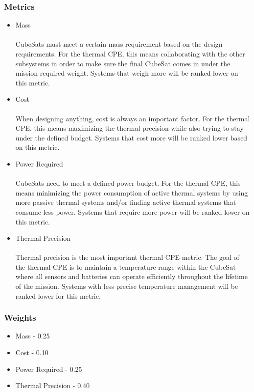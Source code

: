 \documentclass[3p]{elsarticle}
\begin{document}
\subsubsection{Metrics}
\begin{itemize}
   \item Mass \\
   \\
CubeSats must meet a certain mass requirement based on the design requirements. For the thermal CPE, this means collaborating with the other subsystems in order to make sure the final CubeSat comes in under the mission required weight. Systems that weigh more will be ranked lower on this metric.
   \item Cost \\
   \\
When designing anything, cost is always an important factor. For the thermal CPE, this means maximizing the thermal precision while also trying to stay under the  defined budget. Systems that cost more will be ranked lower based on this metric.
   \item Power Required \\
   \\
CubeSats need to meet a defined power budget. For the thermal CPE, this means minimizing the power consumption of active thermal systems by using more passive thermal systems and/or finding active thermal systems that consume less power. Systems that require more power will be ranked lower on this metric.
   \item Thermal Precision \\
   \\
Thermal precision is the most important thermal CPE metric. The goal of the thermal CPE is to maintain a temperature range within the CubeSat where all sensors and batteries can operate efficiently throughout the lifetime of the mission. Systems with less precise temperature management will be ranked lower for this metric.
\end{itemize}

\subsubsection{Weights}
\begin{itemize}
    \item Mass - 0.25
    \item Cost - 0.10
    \item Power Required - 0.25
    \item Thermal Precision - 0.40
\end{itemize}
\end{document}
